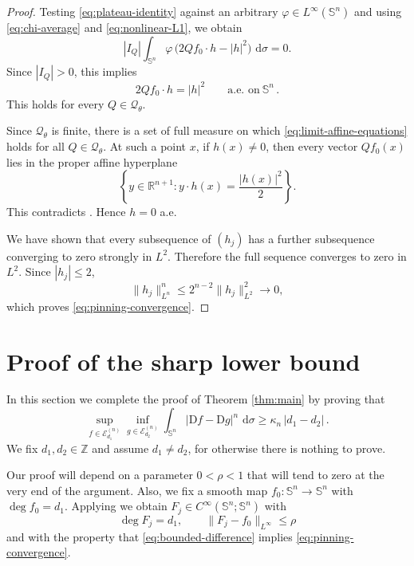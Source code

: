 \documentclass[11pt,reqno]{amsart}
\numberwithin{equation}{section}
\newcommand{\Sph}{\mathbb S}
\newcommand{\R}{\mathbb R}
\newcommand{\Z}{\mathbb Z}
\newcommand{\E}{\mathcal E}
\newcommand{\D}{\mathrm D}
\newcommand{\dd}{\,\mathrm d}
\begin{document}
\begin{proof}
Testing \eqref{eq:plateau-identity} against an arbitrary $\varphi\in L^\infty(\Sph^n)$ and using \eqref{eq:chi-average} and \eqref{eq:nonlinear-L1}, we obtain
\[
  |I_Q|\int_{\Sph^n}\varphi\,\bigl(2Qf_0\cdot h-|h|^2\bigr)\,\dd\sigma=0.
\]
Since $|I_Q|>0$, this implies
\begin{equation}\label{eq:limit-affine-equations}
  2Qf_0\cdot h=|h|^2
  \qquad\text{a.e.~on}\ \Sph^n \,.
\end{equation}
This holds for every $Q\in\mathcal Q_\theta$.

Since $\mathcal Q_\theta$ is finite, there is a set of full measure on which \eqref{eq:limit-affine-equations} holds for all $Q\in\mathcal Q_\theta$.  At such a point $x$, if $h(x)\ne0$, then every vector $Qf_0(x)$ lies in the proper affine hyperplane
\[
  \left\{y\in\R^{n+1}:y\cdot h(x)=\frac{|h(x)|^2}{2}\right\}.
\]
This contradicts .  Hence $h=0$ a.e.

We have shown that every subsequence of $(h_j)$ has a further subsequence converging to zero strongly in $L^2$.  Therefore the full sequence converges to zero in $L^2$.  Since $|h_j|\le2$,
\[
  \|h_j\|_{L^n}^n\le 2^{n-2}\|h_j\|_{L^2}^2\to0,
\]
which proves \eqref{eq:pinning-convergence}.
\end{proof}


\section{Proof of the sharp lower bound}\label{sec:lower}

In this section we complete the proof of Theorem \ref{thm:main} by proving that
\begin{equation}
    \label{eq:lowergoal}
    \sup_{f\in\E_{d_1}^{(n)}}
    \inf_{g\in\E_{d_2}^{(n)}}
    \int_{\Sph^n}|\D f-\D g|^n\,\dd\sigma \geq \kappa_n \, |d_1-d_2| \,.
\end{equation}
We fix $d_1,d_2\in\Z$ and assume $d_1\neq d_2$, for otherwise there is nothing to prove.

Our proof will depend on a parameter $0<\rho<1$ that will tend to zero at the very end of the argument. Also, we fix a smooth map $f_0:\Sph^n\to\Sph^n$ with $\deg f_0=d_1$.  Applying  we obtain $F_j \in C^\infty(\Sph^n;\Sph^n)$ with
\begin{equation}\label{eq:Fj-main}
  \deg F_j=d_1,
  \qquad\|F_j-f_0\|_{L^\infty}\le\rho
\end{equation}
and with the property that \eqref{eq:bounded-difference} implies \eqref{eq:pinning-convergence}.
\end{document}
